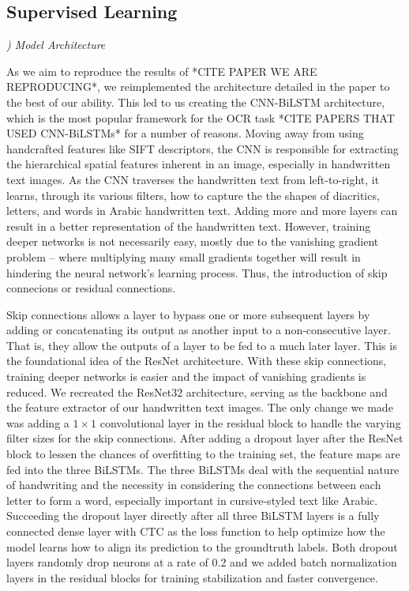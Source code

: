 \documentclass[conference]{IEEEtran}
\newcounter{customsubsubsection} %
\renewcommand{\subsubsection}[1]{%
  \stepcounter{customsubsubsection}%
  \vspace{0.5em} %
  \textit{\arabic{customsubsubsection}) #1}%
  \vspace{0.5em} %
}
\let\oldsubsection\subsection
\renewcommand{\subsection}[1]{%
  \oldsubsection{#1}%
  \setcounter{customsubsubsection}{0}%
}
\begin{document}
\subsection{Supervised Learning}

\subsubsection{Model Architecture}

As we aim to reproduce the results of *CITE PAPER WE ARE REPRODUCING*, we reimplemented the architecture detailed in the paper to the best of our ability. This led to us creating the CNN-BiLSTM architecture, which is the most popular framework for the OCR task *CITE PAPERS THAT USED CNN-BiLSTMs* for a number of reasons. Moving away from using handcrafted features like SIFT descriptors, the CNN is responsible for extracting the hierarchical spatial features inherent in an image, especially in handwritten text images. As the CNN traverses the handwritten text from left-to-right, it learns, through its various filters, how to capture the the shapes of diacritics, letters, and words in Arabic handwritten text. Adding more and more layers can result in a better representation of the handwritten text. However, training deeper networks is not necessarily easy, mostly due to the vanishing gradient problem -- where multiplying many small gradients together will result in hindering the neural network's learning process. Thus, the introduction of skip connecions or residual connections.

Skip connections allows a layer to bypass one or more subsequent layers by adding or concatenating its output as another input to a non-consecutive layer. That is, they allow the outputs of a layer to be fed to a much later layer. This is the foundational idea of the ResNet architecture. With these skip connections, training deeper networks is easier and the impact of vanishing gradients is reduced. We recreated the ResNet32 architecture, serving as the backbone and the feature extractor of our handwritten text images. The only change we made was adding a \( 1 \times 1 \) convolutional layer in the residual block to handle the varying filter sizes for the skip connections. After adding a dropout layer after the ResNet block to lessen the chances of overfitting to the training set, the feature maps are fed into the three BiLSTMs. The three BiLSTMs deal with the sequential nature of handwriting and the necessity in considering the connections between each letter to form a word, especially important in cursive-styled text like Arabic. Succeeding the dropout layer directly after all three BiLSTM layers is a fully connected dense layer with CTC as the loss function to help optimize how the model learns how to align its prediction to the groundtruth labels. Both dropout layers randomly drop neurons at a rate of 0.2 and we added batch normalization layers in the residual blocks for training stabilization and faster convergence.
\end{document}
